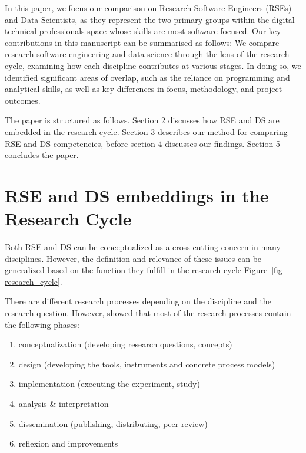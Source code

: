 \documentclass[
        english,biblatex
    ]{lni}
\providecommand{\tightlist}{%
    \setlength{\itemsep}{0pt}\setlength{\parskip}{0pt}}
\begin{document}
    In this paper, we focus our comparison on Research Software
    Engineers (RSEs) and Data Scientists, as they represent the two
    primary groups within the digital technical professionals space
    whose skills are most software-focused. Our key contributions in
    this manuscript can be summarised as follows: We compare research
    software engineering and data science through the lens of the
    research cycle, examining how each discipline contributes at various
    stages. In doing so, we identified significant areas of overlap,
    such as the reliance on programming and analytical skills, as well
    as key differences in focus, methodology, and project outcomes.

    The paper is structured as follows. Section 2 discusses how RSE and
    DS are embedded in the research cycle. Section 3 describes our
    method for comparing RSE and DS competencies, before section 4
    discusses our findings. Section 5 concludes the paper.

    \section{RSE and DS embeddings in the Research
    Cycle}\label{rse-and-ds-embeddings-in-the-research-cycle}

    Both RSE and DS can be conceptualized as a cross-cutting concern in
    many disciplines. However, the definition and relevance of these
    issues can be generalized based on the function they fulfill in the
    research cycle Figure~\ref{fig-research_cycle}.

    There are different research processes depending on the discipline
    and the research question. However, \autocite{Dehne2021} showed that
    most of the research processes contain the following phases:

    \begin{enumerate}
    \def\labelenumi{\arabic{enumi}.}
    \tightlist
    \item
      conceptualization (developing research questions, concepts)
    \item
      design (developing the tools, instruments and concrete process
      models)
    \item
      implementation (executing the experiment, study)
    \item
      analysis \& interpretation
    \item
      dissemination (publishing, distributing, peer-review)
    \item
      reflexion and improvements
    \end{enumerate}
\end{document}
